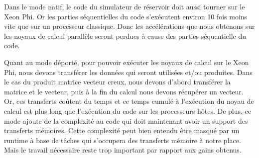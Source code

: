 Dans le mode natif, le code du simulateur de réservoir doit aussi tourner sur le Xeon Phi.
%
Or les parties séquentielles du code s'exécutent environ 10 fois moins vite que sur un processeur classique.
%
Donc les accélérations que nous obtenons sur les noyaux de calcul parallèle seront perdues à cause des parties séquentielle du code.


Quant au mode déporté, pour pouvoir exécuter les noyaux de calcul sur le Xeon Phi, nous devons transférer les données qui seront utilisées et/ou produites.
%
Dans le cas du produit matrice vecteur creux, nous devons d'abord transférer la matrice et le vecteur, puis à la fin du calcul nous devons récupérer un vecteur.
%
Or, ces transferts coûtent du temps et ce temps cumulé à l'exécution du noyau de calcul est plus long que l'exécution du code sur les processeurs hôtes.
%
De plus, ce mode ajoute de la complexité au code qui doit maintenant avoir un support des transferts mémoires.
%
Cette complexité peut bien entendu être masqué par un runtime à base de tâches qui s'occupera des transferts mémoire à notre place.
%
Mais le travail nécessaire reste trop important par rapport aux gains obtenus.

